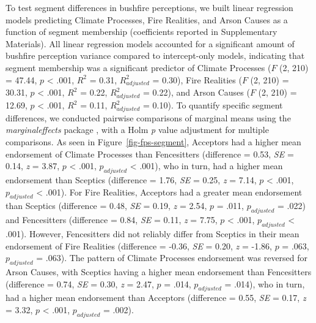 \documentclass[
  letterpaper,
  DIV=11,
  numbers=noendperiod]{scrartcl}
\begin{document}
To test segment differences in bushfire perceptions, we built linear
regression models predicting Climate Processes, Fire Realities, and
Arson Causes as a function of segment membership (coefficients reported
in Supplementary Materials). All linear regression models accounted for
a significant amount of bushfire perception variance compared to
intercept-only models, indicating that segment membership was a
significant predictor of Climate Processes (\(F\) (2, 210) = 47.44,
\(p\) \textless{} .001, \(R^2\) = 0.31, \(R^2_{adjusted}\) = 0.30), Fire
Realities (\(F\) (2, 210) = 30.31, \(p\) \textless{} .001, \(R^2\) =
0.22, \(R^2_{adjusted}\) = 0.22), and Arson Causes (\(F\) (2, 210) =
12.69, \(p\) \textless{} .001, \(R^2\) = 0.11, \(R^2_{adjusted}\) =
0.10). To quantify specific segment differences, we conducted pairwise
comparisons of marginal means using the \emph{marginaleffects} package
\citep{R-marginaleffects}, with a Holm \citeyearpar{holm1979} \emph{p}
value adjustment for multiple comparisons. As seen in
Figure~\ref{fig-fps-segment}, Acceptors had a higher mean endorsement of
Climate Processes than Fencesitters (difference = 0.53, \emph{SE} =
0.14, \emph{z} = 3.87, \(p\) \textless{} .001, \(p_{adjusted}\)
\textless{} .001), who in turn, had a higher mean endorsement than
Sceptics (difference = 1.76, \emph{SE} = 0.25, \emph{z} = 7.14, \(p\)
\textless{} .001, \(p_{adjusted}\) \textless{} .001). For Fire
Realities, Acceptors had a greater mean endorsement than Sceptics
(difference = 0.48, \emph{SE} = 0.19, \emph{z} = 2.54, \(p\) = .011,
\(p_{adjusted}\) = .022) and Fencesitters (difference = 0.84, \emph{SE}
= 0.11, \emph{z} = 7.75, \(p\) \textless{} .001, \(p_{adjusted}\)
\textless{} .001). However, Fencesitters did not reliably differ from
Sceptics in their mean endorsement of Fire Realities (difference =
-0.36, \emph{SE} = 0.20, \emph{z} = -1.86, \(p\) = .063,
\(p_{adjusted}\) = .063). The pattern of Climate Processes endorsement
was reversed for Arson Causes, with Sceptics having a higher mean
endorsement than Fencesitters (difference = 0.74, \emph{SE} = 0.30,
\emph{z} = 2.47, \(p\) = .014, \(p_{adjusted}\) = .014), who in turn,
had a higher mean endorsement than Acceptors (difference = 0.55,
\emph{SE} = 0.17, \emph{z} = 3.32, \(p\) \textless{} .001,
\(p_{adjusted}\) = .002).
\end{document}
